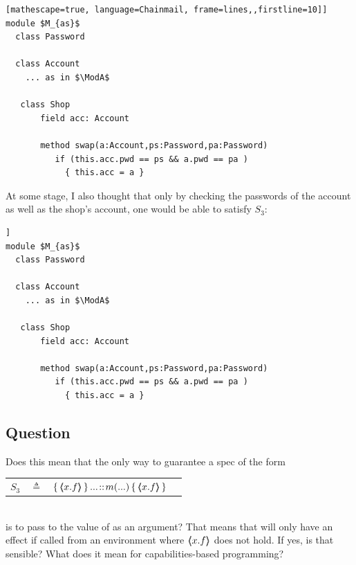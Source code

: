  \begin{lstlisting}[mathescape=true, language=Chainmail, frame=lines,,firstline=10]]
module $M_{as}$        
  class Password
  
  class Account
    ... as in $\ModA$
    
   class Shop
       field acc: Account
       
       method swap(a:Account,ps:Password,pa:Password)
          if (this.acc.pwd == ps && a.pwd == pa )
          	{ this.acc = a }    
\end{lstlisting}

At some stage, I also thought that only by checking the passwords of the account as well as the shop's account, one would be able to satisfy $S_3$:

 \begin{lstlisting}[mathescape=true, language=Chainmail, frame=lines,firstline=10]]
module $M_{as}$        
  class Password
  
  class Account
    ... as in $\ModA$
    
   class Shop
       field acc: Account
       
       method swap(a:Account,ps:Password,pa:Password)
          if (this.acc.pwd == ps && a.pwd == pa )
          	{ this.acc = a }    
\end{lstlisting}



\subsection{Question}


 Does this mean that the only way to guarantee a spec of the form 
 \\
\begin{tabular}{lcll}
 $S_{3}$   & $ \triangleq$ &
					 $ {\mprepostLong 
					 {\inside{x.f}}
					 {...}
					 {m}
					 {...}
					  {\inside{x.f}}
					}$
\end{tabular}\\					
is to pass to  the value of  as an argument? That means that  will only have an effect if called from an environment where $ {\langle\!\!\langle x.f \rangle\!\!\rangle}$ does not hold.
If yes, is that sensible? What does it mean for capabilities-based programming?
